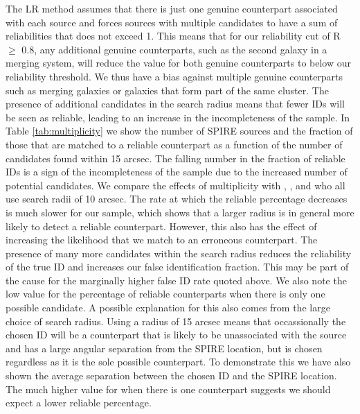 \documentclass[fleqn,usenatbib]{mnras}
\begin{document}
The LR method assumes that there is just one genuine counterpart associated with each source and forces sources with multiple candidates to have a sum of reliabilities that does not exceed 1. This means that for our reliability cut of R $\geq$ 0.8, any additional genuine counterparts, such as the second galaxy in a merging system, will reduce the value for both genuine counterparts to below our reliability threshold. We thus have a bias against multiple genuine counterparts such as merging galaxies or galaxies that form part of the same cluster. The presence of additional candidates in the search radius means that fewer IDs will be seen as reliable, leading to an increase in the incompleteness of the sample. In Table \ref{tab:multiplicity} we show the number of SPIRE sources and the fraction of those that are matched to a reliable counterpart as a function of the number of candidates found within 15 arcsec. The falling number in the fraction of reliable IDs is a sign of the incompleteness of the sample due to the increased number of potential candidates. We compare the effects of multiplicity with \citealt{Smith_2011}, \citealt{Fleuren_2012}, \citealt{Bourne_2016} and  \citealt{Furlanetto_2018} who all use search radii of 10 arcsec. The rate at which the reliable percentage decreases is much slower for our sample, which shows that a larger radius is in general more likely to detect a reliable counterpart. However, this also has the effect of increasing the likelihood that we match to an erroneous counterpart. The presence of many more candidates within the search radius reduces the reliability of the true ID and increases our false identification fraction. This may be part of the cause for the marginally higher false ID rate quoted above. We also note the low value for the percentage of reliable counterparts when there is only one possible candidate. A possible explanation for this also comes from the large choice of search radius. Using a radius of 15 arcsec means that occassionally the chosen ID will be a counterpart that is likely to be unassociated with the source and has a large angular separation from the SPIRE location, but is chosen regardless as it is the sole possible counterpart. To demonstrate this we have also shown the average separation between the chosen ID and the SPIRE location. The much higher value for when there is one counterpart suggests we should expect a lower reliable percentage. 
\end{document}
